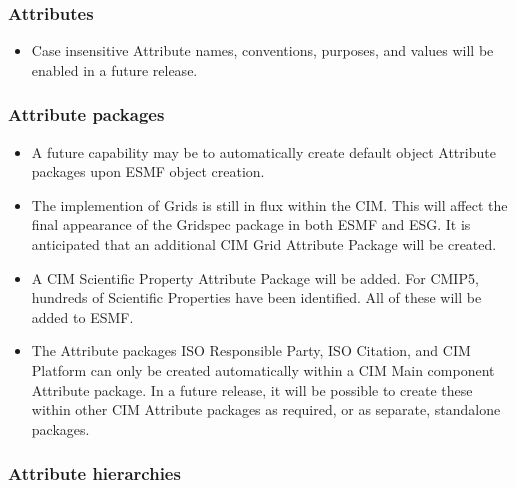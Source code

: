 %


\subsubsection{Attributes}

\begin{itemize}
\item Case insensitive Attribute names, conventions, purposes, and values will be enabled in a future release.
\end{itemize}


\subsubsection{Attribute packages}

\begin{itemize}
\item A future capability may be to automatically create default object Attribute packages upon ESMF object creation.
\item The implemention of Grids is still in flux within the CIM.  This will affect the final appearance of the Gridspec package in both ESMF and ESG. It is anticipated that an additional CIM Grid Attribute Package will be created.
\item A CIM Scientific Property Attribute Package will be added. For CMIP5, hundreds of Scientific Properties have been identified. All of these will be added to ESMF. 
\item The Attribute packages ISO Responsible Party, ISO Citation, and CIM Platform can only be created automatically within a CIM Main component Attribute package.  In a future release, it will be possible to create these within other CIM Attribute packages as required, or as separate, standalone packages.
\end{itemize}


\subsubsection{Attribute hierarchies}

